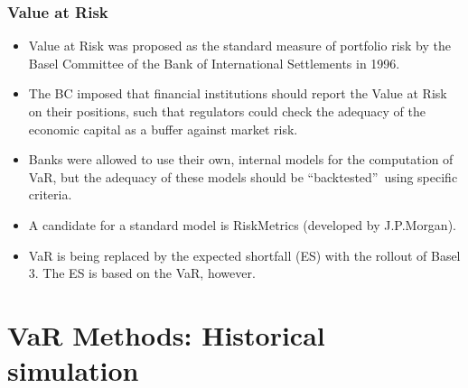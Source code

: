 \begin{frame}%

\frametitle{Value at Risk}

\begin{itemize}
\item Value at Risk was proposed as the standard measure of portfolio risk
by the Basel Committee of the Bank of International Settlements in 1996.

\item The BC imposed that financial institutions should report the Value at
Risk on their positions, such that regulators could check the adequacy of
the economic capital as a buffer against market risk.

\item Banks were allowed to use their own, internal models for the
computation of VaR, but the adequacy of these models should be
\textquotedblleft backtested\textquotedblright\ using specific criteria.

\item A candidate for a standard model is RiskMetrics (developed by
J.P.Morgan).
\item VaR is being replaced by the expected shortfall (ES) with the rollout of Basel 3. The ES is based on the VaR, however.
\end{itemize}

\end{frame}%
\section[Historical Simulation]{VaR Methods: Historical simulation}\subsection*{}

